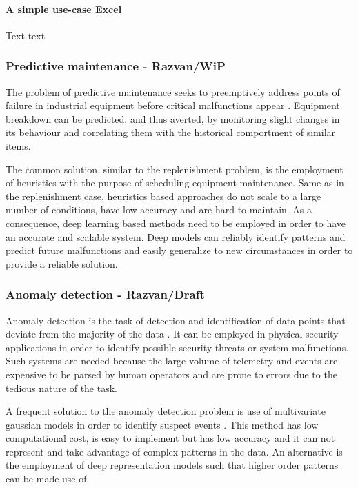 \documentclass{article}
\begin{document}
\paragraph{A simple use-case Excel} Text text

\subsubsection{Predictive maintenance - Razvan/WiP}
The problem of predictive maintenance seeks to preemptively address points of failure in industrial equipment before critical malfunctions appear \cite{mobley2002introduction}. Equipment breakdown can be predicted, and thus averted, by monitoring slight changes in its behaviour and correlating them with the historical comportment of similar items.

The common solution, similar to the replenishment problem, is the employment of heuristics with the purpose of scheduling equipment maintenance. Same as in the replenishment case, heuristics based approaches do not scale to a large number of conditions, have low accuracy and are hard to maintain. As a consequence, deep learning based methods \cite{zhao2019deep} need to be employed in order to have an accurate and scalable system. Deep models can reliably identify patterns and predict future malfunctions and easily generalize to new circumstances in order to provide a reliable solution.


\subsubsection{Anomaly detection - Razvan/Draft}
Anomaly detection is the task of detection and identification of data points that deviate from the majority of the data \cite{chandola2009anomaly}. It can be employed in physical security applications in order to identify possible security threats or system malfunctions. Such systems are needed because the large volume of telemetry and events are expensive to be parsed by human operators and are prone to errors due to the tedious nature of the task. 

A frequent solution to the anomaly detection problem is use of multivariate gaussian models in order to identify suspect events \cite{mehrotra2017anomaly}. This method has low computational cost, is easy to implement but has low accuracy and it can not represent and take advantage of complex patterns in the data. An alternative is the employment of deep representation models \cite{chalapathy2019deep} such that higher order patterns can be made use of. 
\end{document}
